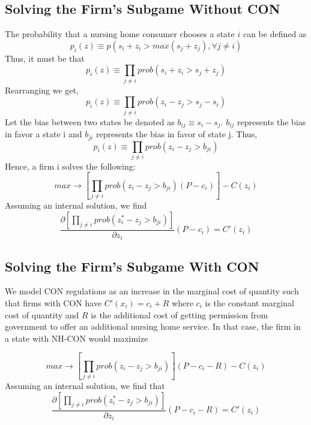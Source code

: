 \documentclass[../Main.tex]{subfiles}
\begin{document}
\subsection{Solving the Firm's Subgame Without CON}
The probability that a nursing home consumer chooses a state $i$ can be defined as \begin{equation}p_i(z) \equiv p(s_i + z_i > max(s_j + z_j), \forall j \neq i )\end{equation}
Thus, it must be that \begin{equation}p_i(z) \equiv \prod_{j\neq i} prob(s_i + z_i > s_j + z_j) \end{equation} 
Rearranging we get,
 \begin{equation}p_i(z) \equiv \prod_{j\neq i} prob(z_i-z_j > s_j - s_i) \end{equation} 
Let the bias between two states be denoted as $b_{ij} \equiv s_i - s_j $. $b_{ij}$ represents the bias in favor a state i and $b_{ji}$ represents the bias in favor of state j. Thus,\begin{equation}p_i(z) \equiv \prod_{j\neq i} prob(z_i -z_j > b_{ji}) \end{equation}  
Hence, a firm i solves the following:\begin{equation}max \rightarrow [\prod_{j\neq i} prob(z_i -z_j > b_{ji})(P-c_i)] - C(z_i)\end{equation}
Assuming an internal solution, we find 
 \begin{equation}\frac{\partial [\prod_{j\neq i} prob(z_i^* -z_j > b_{ji})]}{\partial z_i}(P-c_i) = C'(z_i) \end{equation}

\subsection{Solving the Firm's Subgame With CON}

We model CON regulations as an increase in the marginal cost of quantity such that firms with CON have $C'(x_i) = c_i + R$ where $c_i$ is the constant marginal cost of quantity  and $R$ is the additional cost of getting permission from government to offer an additional nursing home service. In that case, the firm in a state with NH-CON would maximize

\begin{equation} max \rightarrow [\prod_{j\neq i} prob(z_i -z_j > b_{ji})](P - c_i - R) - C(z_i) \end{equation}
Assuming an internal solution, we find that
 \begin{equation}\frac{\partial [\prod_{j\neq i} prob(z_i^* - z_j > b_{ji})]}{\partial z_i}(P - c_i - R) = C'(z_i) \end{equation}
\end{document}
